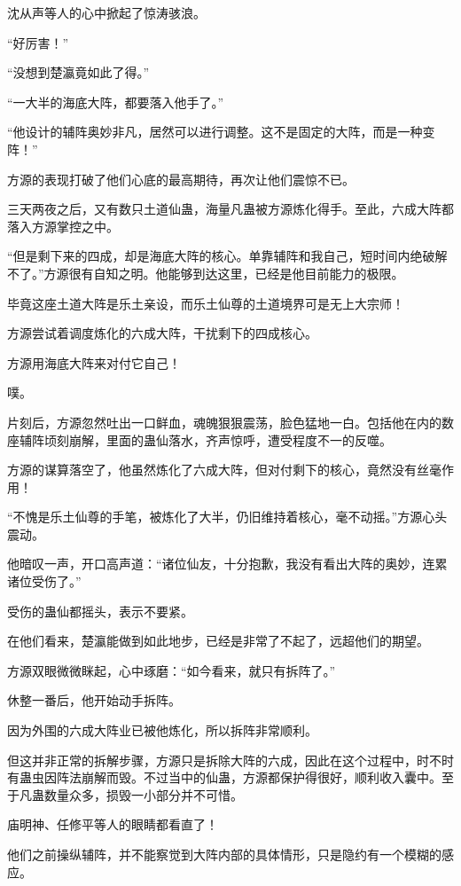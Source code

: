 \begin{this_body}
沈从声等人的心中掀起了惊涛骇浪。

“好厉害！”

“没想到楚瀛竟如此了得。”

“一大半的海底大阵，都要落入他手了。”

“他设计的辅阵奥妙非凡，居然可以进行调整。这不是固定的大阵，而是一种变阵！”

方源的表现打破了他们心底的最高期待，再次让他们震惊不已。

三天两夜之后，又有数只土道仙蛊，海量凡蛊被方源炼化得手。至此，六成大阵都落入方源掌控之中。

“但是剩下来的四成，却是海底大阵的核心。单靠辅阵和我自己，短时间内绝破解不了。”方源很有自知之明。他能够到达这里，已经是他目前能力的极限。

毕竟这座土道大阵是乐土亲设，而乐土仙尊的土道境界可是无上大宗师！

方源尝试着调度炼化的六成大阵，干扰剩下的四成核心。

方源用海底大阵来对付它自己！

噗。

片刻后，方源忽然吐出一口鲜血，魂魄狠狠震荡，脸色猛地一白。包括他在内的数座辅阵顷刻崩解，里面的蛊仙落水，齐声惊呼，遭受程度不一的反噬。

方源的谋算落空了，他虽然炼化了六成大阵，但对付剩下的核心，竟然没有丝毫作用！

“不愧是乐土仙尊的手笔，被炼化了大半，仍旧维持着核心，毫不动摇。”方源心头震动。

他暗叹一声，开口高声道：“诸位仙友，十分抱歉，我没有看出大阵的奥妙，连累诸位受伤了。”

受伤的蛊仙都摇头，表示不要紧。

在他们看来，楚瀛能做到如此地步，已经是非常了不起了，远超他们的期望。

方源双眼微微眯起，心中琢磨：“如今看来，就只有拆阵了。”

休整一番后，他开始动手拆阵。

因为外围的六成大阵业已被他炼化，所以拆阵非常顺利。

但这并非正常的拆解步骤，方源只是拆除大阵的六成，因此在这个过程中，时不时有蛊虫因阵法崩解而毁。不过当中的仙蛊，方源都保护得很好，顺利收入囊中。至于凡蛊数量众多，损毁一小部分并不可惜。

庙明神、任修平等人的眼睛都看直了！

他们之前操纵辅阵，并不能察觉到大阵内部的具体情形，只是隐约有一个模糊的感应。


\end{this_body}
